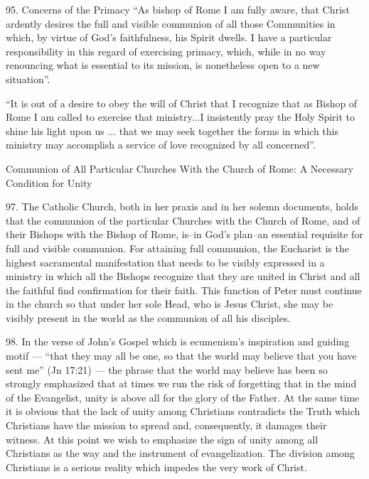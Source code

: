 \documentclass[oneside]{book}
\begin{document}
95. Concerns of the Primacy  ``As bishop of Rome  I am fully aware,  that Christ
ardently desires the full and visible communion of all those Communities in
which, by virtue of God's faithfulness, his Spirit dwells. I have a particular
responsibility in this regard of exercising primacy, which, while in no way
renouncing what is essential to its mission, is nonetheless open to a new
situation''. 

``It is out of a desire to obey the will of Christ that I recognize that as
Bishop of Rome I am called to exercise that ministry...I insistently pray the
Holy Spirit to shine his light upon us ... that we may seek together the forms
in which this ministry may accomplish a service of love recognized by all
concerned''.

Communion of All Particular Churches With the Church of Rome:  A Necessary
Condition for Unity

97.  The Catholic Church, both in her praxis and in her solemn documents, holds
that the communion of the particular Churches with the Church of Rome, and of
their Bishops with the Bishop of Rome, is--in God's plan--an essential requisite
for full and visible communion. For attaining full communion, the Eucharist is
the highest sacramental manifestation that needs to be visibly expressed in a
ministry in which all the Bishops recognize that they are united in Christ and
all the faithful find confirmation for their faith. This function of Peter must
continue in the church so that under her sole Head, who is Jesus Christ, she may
be visibly present in the world as the communion of all his disciples.

98. In the verse of John's Gospel which is ecumenism's inspiration and guiding
motif --- ``that they may all be one, so that the world may believe that you
have sent me'' (Jn 17:21) --- the phrase  that the world may believe has been so
strongly emphasized that at times we run the risk of forgetting that in the mind
of the Evangelist, unity is above all for the glory of the Father. At the same
time it is obvious that the lack of unity among Christians contradicts the Truth
which Christians have the mission to spread and,  consequently,  it damages
their witness. At this point we wish to emphasize the sign of unity among all
Christians as the way and the instrument of evangelization. The division among
Christians is a serious reality which impedes the very work of Christ.

\end{document}
